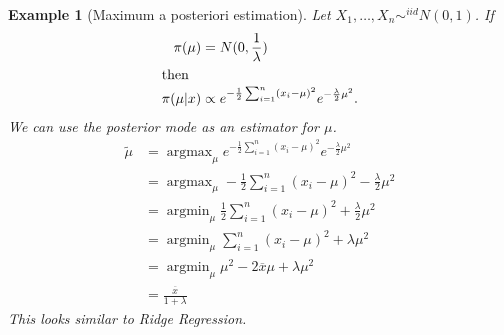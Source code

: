 \documentclass[10pt]{article}
\newtheorem{example}[ex]{Example}
\DeclareMathOperator*{\argmin}{argmin}
\DeclareMathOperator*{\argmax}{argmax}
\begin{document}
\begin{example}[Maximum a posteriori estimation]
  Let $X_1,\ldots,X_n\sim^{iid} N(0,1)$. If 
  \begin{align*}
    \pi(\mu) &= N(0,\frac{1}{\lambda})\\
\intertext{then}
    \pi(\mu|x) &\propto
    e^{-\frac{1}{2}\sum_{i=1}^{n}(x_i-\mu)^{2}}e^{-\frac{\lambda}{2}\mu^{2}}.
  \end{align*}
  We can use the posterior mode as an estimator for $\mu$. 
  \begin{align*}
    \tilde{\mu} &=\argmax_\mu
    e^{-\frac{1}{2}\sum_{i=1}^{n}(x_i-\mu)^{2}}e^{-\frac{\lambda}{2}\mu^{2}}\\
    &= \argmax_\mu -\frac{1}{2}\sum_{i=1}^{n}(x_i-\mu)^{2}-\frac{\lambda}{2}\mu^{2}\\
    &=\argmin_\mu \frac{1}{2}\sum_{i=1}^{n}(x_i-\mu)^{2}+\frac{\lambda}{2}\mu^{2}\\
    &=\argmin_\mu \sum_{i=1}^{n}(x_i-\mu)^{2}+\lambda\mu^{2}\\
    &= \argmin_\mu \mu^2 - 2\overline{x}\mu + \lambda\mu^2\\
    &= \frac{\overline{x}}{1+\lambda}
  \end{align*}
  This looks similar to Ridge Regression.
\end{example}
\end{document}
